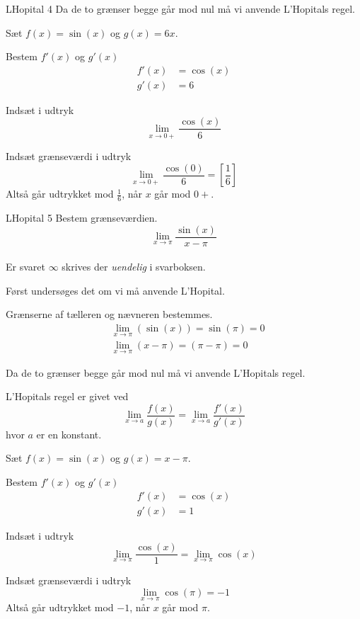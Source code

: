 \documentclass{article}
\begin{document}
\begin{exercise}{LHopital 4}
	\hint
	Da de to grænser begge går mod nul må vi  anvende L'Hopitals regel. 
	
	\hint
	Sæt $f(x) = \sin(x)$ og $g(x) = 6x$. 
	
	\hint
	Bestem $f'(x)$ og $g'(x)$
	\begin{align*}
		f'(x) &=  \cos(x) \\
		g'(x) &= 6
	\end{align*}
	
	\hint
	Indsæt i udtryk
	\[
	\lim_{x \to 0+} \frac{\cos(x)}{6} 
	\]
	
	\hint
	Indsæt grænseværdi i udtryk
	\[
	\lim_{x \to 0+} \frac{\cos(0)}{6}  = \left[ \frac{1}{6}  \right] 
	\]
	Altså går udtrykket mod $\frac{1}{6}$, når $x$ går mod $0+$. 
	
\end{exercise}

\begin{exercise}{LHopital 5}
	Bestem grænseværdien.
	\[
	\lim_{x \to \pi} \frac{\sin(x)}{x - \pi}
	\] 
	\\
	Er svaret $\infty$ skrives der \emph{uendelig} i svarboksen.
	
	
	\hint
	Først undersøges det om vi må anvende L'Hopital.
	
	\hint
	Grænserne af tælleren og nævneren bestemmes.
	\begin{align*}
		&\lim_{x \to \pi} (\sin(x)) = \sin(\pi) = 0 \\
		&\lim_{x \to \pi} (x - \pi) = (\pi - \pi) = 0
	\end{align*}
	
	\hint
	Da de to grænser begge går mod nul må vi  anvende L'Hopitals regel. 
	
	\hint
	L'Hopitals regel er givet ved
	\[
	\lim_{x \to a} \frac{f(x)}{g(x)} = \lim_{x \to a} \frac{f'(x)}{g'(x)} 
	\]
	hvor $a$  er en konstant.
	
	\hint
	Sæt $f(x) = \sin(x)$ og $g(x) = x - \pi$. 
	
	\hint
	Bestem $f'(x)$ og $g'(x)$
	\begin{align*}
		f'(x) &= \cos(x) \\
		g'(x) &= 1
	\end{align*}
	
	\hint
	Indsæt i udtryk
	\[
	\lim_{x \to \pi} \frac{\cos(x)}{1}  = \lim_{x \to \pi} \cos(x)
	\]
	
	\hint
	Indsæt grænseværdi i udtryk
	\[
	\lim_{x \to \pi} \cos(\pi) = -1
	\]
	Altså går udtrykket mod $-1$, når $x$ går mod $\pi$. 
	
\end{exercise}
\end{document}

